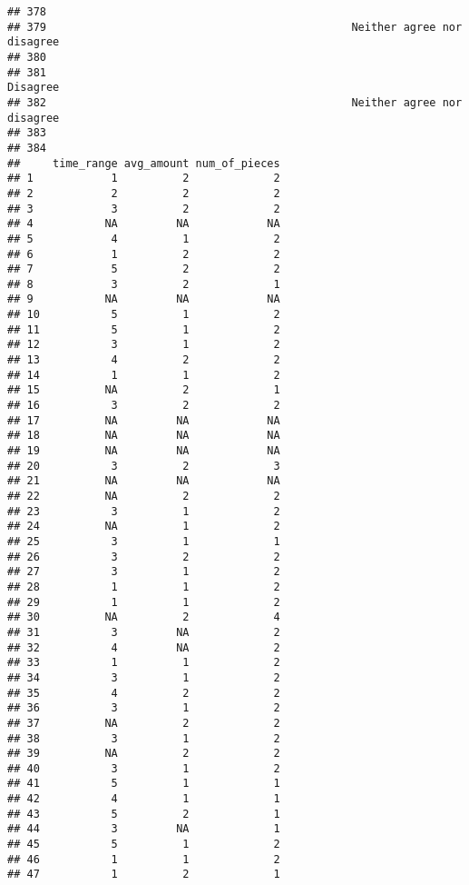 \documentclass[
]{article}
\begin{document}
\begin{verbatim}
## 378                                                                         
## 379                                               Neither agree nor disagree
## 380                                                                         
## 381                                                                 Disagree
## 382                                               Neither agree nor disagree
## 383                                                                         
## 384                                                                         
##     time_range avg_amount num_of_pieces
## 1            1          2             2
## 2            2          2             2
## 3            3          2             2
## 4           NA         NA            NA
## 5            4          1             2
## 6            1          2             2
## 7            5          2             2
## 8            3          2             1
## 9           NA         NA            NA
## 10           5          1             2
## 11           5          1             2
## 12           3          1             2
## 13           4          2             2
## 14           1          1             2
## 15          NA          2             1
## 16           3          2             2
## 17          NA         NA            NA
## 18          NA         NA            NA
## 19          NA         NA            NA
## 20           3          2             3
## 21          NA         NA            NA
## 22          NA          2             2
## 23           3          1             2
## 24          NA          1             2
## 25           3          1             1
## 26           3          2             2
## 27           3          1             2
## 28           1          1             2
## 29           1          1             2
## 30          NA          2             4
## 31           3         NA             2
## 32           4         NA             2
## 33           1          1             2
## 34           3          1             2
## 35           4          2             2
## 36           3          1             2
## 37          NA          2             2
## 38           3          1             2
## 39          NA          2             2
## 40           3          1             2
## 41           5          1             1
## 42           4          1             1
## 43           5          2             1
## 44           3         NA             1
## 45           5          1             2
## 46           1          1             2
## 47           1          2             1

\end{verbatim}
\end{document}
